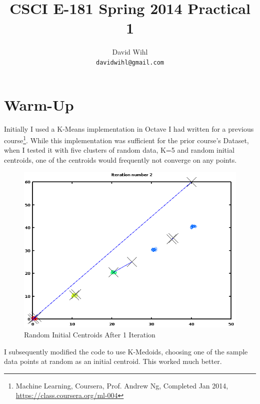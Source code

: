 \documentclass[11pt, oneside]{article}   	%
\title{CSCI E-181 Spring 2014 Practical 1}
\author{David Wihl\\
     \texttt{davidwihl@gmail.com}}
\begin{document}
\maketitle
\section*{Warm-Up}


\par Initially I used a K-Means implementation in Octave I had written for a previous course\footnote{Machine Learning, Coursera, Prof. Andrew Ng, Completed Jan 2014, \url{https://class.coursera.org/ml-004}}.  While this implementation was sufficient for the prior course's Dataset, when I tested it with five clusters of random data, K=5 and random initial centroids, one of the centroids would frequently not converge on any points.

\begin{figure}[h!]
\centering
\includegraphics[scale=0.6]{randominitialClusters}
\caption{Random Initial Centroids After 1 Iteration}
\end{figure}

I subsequently modified the code to use K-Medoids, choosing one of the sample data points at random as an initial centroid. This worked much better.
\end{document}
